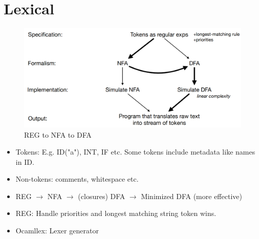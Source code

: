 \section{Lexical}

\begin{figure}[h]
    \centering
    \includegraphics[scale=0.4]{assets/reg_nfa_dfa.png}
    \caption{REG to NFA to DFA}
    \label{fig:reg}
\end{figure}

\begin{itemize}
    \item Tokens: E.g. \textsc{ID}("a"), INT, IF etc. Some tokens include metadata like names in ID.
    \item Non-tokens: comments, whitespace etc.
    \item REG $\rightarrow$ NFA $\rightarrow$ (closures) DFA $\rightarrow$ Minimized DFA (more effective)
    \item REG: Handle priorities and longest matching string token wins.
    \item Ocamllex: Lexer generator
\end{itemize}